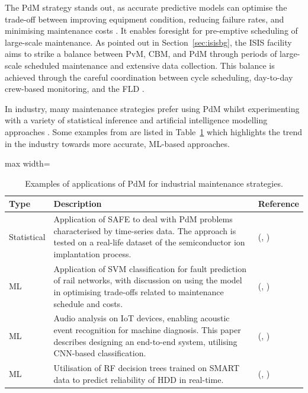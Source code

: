 \documentclass[10pt,oneside]{report}
\renewcommand{\citet}[1]{\citeauthor{#1}, \citeyear{#1}}
\begin{document}
The PdM strategy stands out, as accurate predictive models can optimise the trade-off between improving equipment condition, reducing failure rates, and minimising maintenance costs \cite{carvalho2019systematic}. It enables foresight for pre-emptive scheduling of large-scale maintenance. As pointed out in Section~\ref{sec:isisbg}, the ISIS facility aims to strike a balance between PvM, CBM, and PdM through periods of large-scale scheduled maintenance and extensive data collection. This balance is achieved through the careful coordination between cycle scheduling, day-to-day crew-based monitoring, and the FLD \cite{thomason2019isis}.

In industry, many maintenance strategies prefer using PdM whilst experimenting with a variety of statistical inference and artificial intelligence modelling approaches \cite{mobley2002introduction, jezzini2013effects}. Some examples from \cite{carvalho2019systematic} are listed in Table~\ref{tab:pdmPaperTable} which highlights the trend in the industry towards more accurate, ML-based approaches.

\begin{table}[htbp]
    \fontsize{8}{12}\selectfont
    \centering
    \begin{adjustbox}{max width=\textwidth}
    \begin{tabular}{p{1.5cm} p{8.5cm} p{3cm}}
        \toprule
        \textbf{Type} & \textbf{Description} & \textbf{Reference} \\
        \midrule
        Statistical & Application of SAFE to deal with PdM problems characterised by time-series data. The approach is tested on a real-life dataset of the semiconductor ion implantation process. & (\citet{susto2016dealing})\\
        ML & Application of SVM classification for fault prediction of rail networks, with discussion on using the model in optimising trade-offs related to maintenance schedule and costs. & (\citet{li2014improving})\\
        ML & Audio analysis on IoT devices, enabling acoustic event recognition for machine diagnosis. This paper describes designing an end-to-end system, utilising CNN-based classification. & (\citet{pan2017cognitive})  \\
        ML & Utilisation of RF decision trees trained on SMART data to predict reliability of HDD in real-time. & (\citet{su2018real}) \\
        \bottomrule
    \end{tabular}
    \end{adjustbox}
    \caption{Examples of applications of PdM for industrial maintenance strategies.}
    \label{tab:pdmPaperTable}
\end{table}
\end{document}
